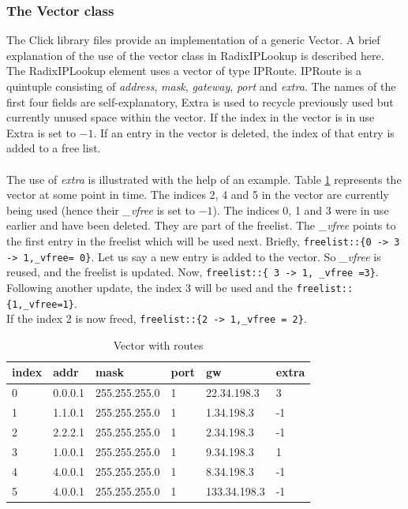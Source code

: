 \documentclass{article}
\begin{document}
\subsubsection{The Vector class}
The Click library files provide an implementation of a generic Vector. A brief explanation of the use of the vector class in RadixIPLookup is described here. The RadixIPLookup element uses a vector of type IPRoute. IPRoute is a quintuple consisting of \emph{address}, \emph{mask}, \emph{gateway}, \emph{port} and \emph{extra}. The names of the first four fields are self-explanatory, Extra is used to recycle previously used but currently unused space within the vector. If the index in the vector is in use Extra is set to $-1$. If an entry in the vector is deleted, the index of that entry is added to a free list.\\
\\The use of \emph{extra} is illustrated with the help of an example. Table \ref{tbl:vector} represents the vector at some point in time. The indices 2, 4 and 5 in the vector are currently being used (hence their \emph{\_vfree} is set to $-1$). The indices 0, 1 and 3 were in use earlier and have been deleted. They are part of the freelist. The \emph{\_vfree} points to the first entry in the freelist which will be used next. Briefly, \verb$freelist::{0 -> 3 -> 1,_vfree= 0}$. Let us say a new entry is added to the vector. So \emph{\_vfree} is reused, and the freelist is updated. Now, \verb$freelist::{ 3 -> 1, _vfree =3}$. Following another update, the index 3 will be used and the \verb$freelist::{1,_vfree=1}$. 
\\If the index 2 is now freed, \verb$freelist::{2 -> 1,_vfree = 2}$.
\\
\begin{table}
\begin{center}
\begin{tabular}{|l|l|l|l|l|l|}
\hline index & addr & mask & port & gw & extra \\ 
\hline 0 & 0.0.0.1 & 255.255.255.0 & 1& 22.34.198.3 & 3\\ 
\hline 1 & 1.1.0.1 & 255.255.255.0 & 1& 1.34.198.3 & -1\\
\hline 2 & 2.2.2.1 & 255.255.255.0 & 1& 2.34.198.3 & -1\\
\hline 3 & 1.0.0.1 & 255.255.255.0 & 1& 9.34.198.3 & 1\\
\hline 4 & 4.0.0.1 & 255.255.255.0 & 1& 8.34.198.3 & -1\\
\hline 5 & 4.0.0.1 & 255.255.255.0 & 1& 133.34.198.3 & -1\\
\hline
\end{tabular}
\end{center}
\label{tbl:vector}
\caption{Vector with routes}
\end{table}
\end{document}
